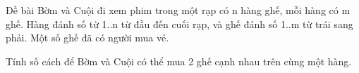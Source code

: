 Đề bài  
Bờm và Cuội đi xem phim trong một rạp có n hàng ghế, mỗi hàng có m ghế. Hàng đánh số từ 1..n từ đầu đến cuối rạp, và ghế đánh số 1..m từ trái sang phải. Một số ghế đã có người mua vé.  

   Tính số cách để Bờm và Cuội có thể mua 2 ghế cạnh nhau trên cùng một hàng.